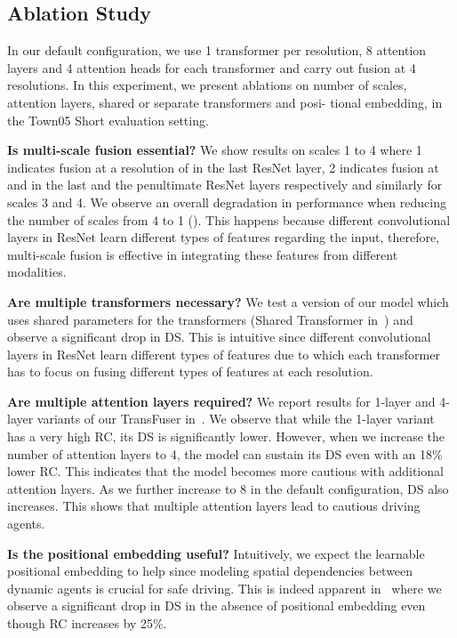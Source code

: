 \documentclass[final]{cvpr}
\begin{document}
\subsection{Ablation Study} \label{sec:ablation} In our default configuration, we use 1 transformer per
resolution, 8 attention layers and 4 attention heads for each transformer and carry out fusion at 4 resolutions. In this experiment, we present ablations on number of scales, attention layers, shared or separate transformers and posi-
tional embedding, in the Town05 Short evaluation setting.

\noindent \textbf{Is multi-scale fusion essential?} We show results on scales 1 to 4 where 1 indicates fusion at a resolution of  in the last ResNet layer, 2 indicates fusion at  and  in the last and the penultimate ResNet layers respectively and similarly for scales 3 and 4. We observe an overall degradation in performance when reducing the number of scales from 4 to 1 (). This happens because different convolutional layers in ResNet learn different types of features regarding the input, therefore, multi-scale fusion is effective in integrating these features from different modalities.

\noindent \textbf{Are multiple transformers necessary?} We test a version of our model which uses shared parameters for the transformers (Shared Transformer in~) and observe a significant drop in DS. This is intuitive since different convolutional layers in ResNet learn different types of features due to which each transformer has to focus on fusing different types of features at each resolution.

\noindent \textbf{Are multiple attention layers required?} We report results for 1-layer and 4-layer variants of our TransFuser in~. We observe that while the 1-layer variant has a very high RC, its DS is significantly lower. However, when we increase the number of attention layers to 4, the model can sustain its DS even with an 18\% lower RC. This indicates that the model becomes more cautious with additional attention layers. As we further increase  to 8 in the default configuration, DS also increases. This shows that multiple attention layers lead to cautious driving agents.

\noindent \textbf{Is the positional embedding useful?} Intuitively, we expect the learnable positional embedding to help since modeling spatial dependencies between dynamic agents is crucial for safe driving. This is indeed apparent in~ where we observe a significant drop in DS in the absence of positional embedding even though RC increases by 25\%.
\end{document}
